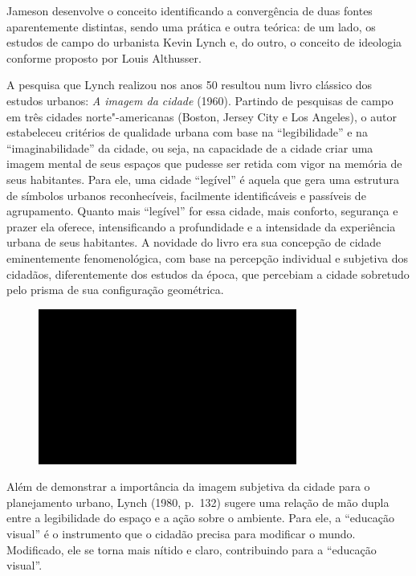 Jameson desenvolve o conceito identificando a convergência de duas
fontes aparentemente distintas, sendo uma prática e outra teórica: de um
lado, os estudos de campo do urbanista Kevin Lynch e, do outro, o
conceito de ideologia conforme proposto por Louis Althusser.

A pesquisa que Lynch realizou nos anos 50 resultou num livro clássico
dos estudos urbanos: \emph{A imagem da cidade} (1960). Partindo de
pesquisas de campo em três cidades norte"-americanas (Boston, Jersey City
e Los Angeles), o autor estabeleceu critérios de qualidade urbana com
base na ``legibilidade'' e na ``imaginabilidade'' da cidade, ou seja, na
capacidade de a cidade criar uma imagem mental de seus espaços que
pudesse ser retida com vigor na memória de seus habitantes. Para ele,
uma cidade ``legível'' é aquela que gera uma estrutura de símbolos
urbanos reconhecíveis, facilmente identificáveis e passíveis de
agrupamento. Quanto mais ``legível'' for essa cidade, mais conforto,
segurança e prazer ela oferece, intensificando a profundidade e a
intensidade da experiência urbana de seus habitantes. A novidade do
livro era sua concepção de cidade eminentemente fenomenológica, com base
na percepção individual e subjetiva dos cidadãos, diferentemente dos
estudos da época, que percebiam a cidade sobretudo pelo prisma de sua
configuração geométrica.

\begin{figure}[!ht]
\centering
 \includegraphics[width=85mm]{./imgs/im1.jpg}
\caption{\tiny{}}
\end{figure}

Além de demonstrar a importância da imagem subjetiva da cidade para o
planejamento urbano, Lynch (1980, p.~132) sugere uma relação de mão
dupla entre a legibilidade do espaço e a ação sobre o ambiente. Para
ele, a ``educação visual'' é o instrumento que o cidadão precisa para
modificar o mundo. Modificado, ele se torna mais nítido e claro,
contribuindo para a ``educação visual''.

